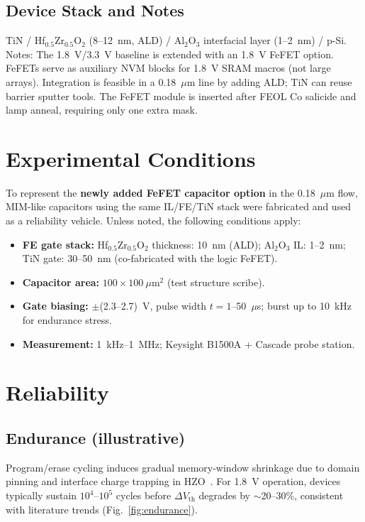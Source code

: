 \documentclass[conference]{IEEEtran}
\begin{document}
\subsection{Device Stack and Notes}
TiN / Hf$_{0.5}$Zr$_{0.5}$O$_2$ (8--12~nm, ALD) / Al$_2$O$_3$ interfacial layer (1--2~nm) / p-Si. Notes: The 1.8~V/3.3~V baseline is extended with an 1.8~V FeFET option. FeFETs serve as auxiliary NVM blocks for 1.8~V SRAM macros (not large arrays). Integration is feasible in a 0.18~$\mu$m line by adding ALD; TiN can reuse barrier sputter tools. The FeFET module is inserted after FEOL Co salicide and lamp anneal, requiring only one extra mask.

\section{Experimental Conditions}
To represent the \textbf{newly added FeFET capacitor option} in the 0.18~$\mu$m flow, MIM-like capacitors using the same IL/FE/TiN stack were fabricated and used as a reliability vehicle. Unless noted, the following conditions apply:
\begin{itemize}
  \item \textbf{FE gate stack:} Hf$_{0.5}$Zr$_{0.5}$O$_2$ thickness: 10~nm (ALD); Al$_2$O$_3$ IL: 1--2~nm; TiN gate: 30--50~nm (co-fabricated with the logic FeFET).
  \item \textbf{Capacitor area:} $100 \times 100~\mu$m$^2$ (test structure scribe).
  \item \textbf{Gate biasing:} $\pm$(2.3--2.7)~V, pulse width $t = 1$--50~$\mu$s; burst up to 10~kHz for endurance stress.
  \item \textbf{Measurement:} 1~kHz--1~MHz; Keysight B1500A + Cascade probe station.
\end{itemize}

\section{Reliability}
\subsection{Endurance (illustrative)}
Program/erase cycling induces gradual memory-window shrinkage due to domain pinning and interface charge trapping in HZO~\cite{Boscke2011,Mueller2012}. For 1.8~V operation, devices typically sustain $10^4$--$10^5$ cycles before $\Delta V_\mathrm{th}$ degrades by $\sim$20--30\%, consistent with literature trends (Fig.~\ref{fig:endurance}).
\end{document}

